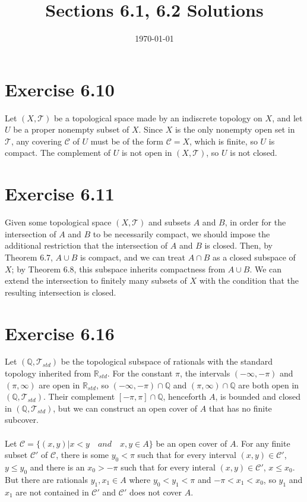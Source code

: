 \documentclass{article}
\title{\textbf{Sections 6.1, 6.2 Solutions}}
\date{}
\date\today
\begin{document}
\maketitle %

\thispagestyle{firstpage}
\section*{Exercise 6.10}

Let $(X, \mathcal{T})$ be a topological space made by an indiscrete topology on $X$, and let $U$ be a proper nonempty subset of $X$.  
Since $X$ is the only nonempty open set in $\mathcal{T}$, any covering $\mathcal{C}$ of $U$ must be of the form $\mathcal{C} = X$, which 
is finite, so $U$ is compact.  The complement of $U$ is not open in $(X, \mathcal{T})$, so $U$ is not closed. 


\section*{Exercise 6.11} 

Given some topological space $(X, \mathcal{T})$ and subsets $A$ and $B$, in order for the intersection of  
$A$ and $B$ to be necessarily compact, we should impose the additional restriction that 
the intersection of $A$ and $B$ is closed.  Then, by Theorem 6.7, $A \cup B$ is compact, and 
we can treat $A \cap B$ as a closed subspace of $X$; by Theorem 6.8, this subspace
inherits compactness from $A \cup B$.  We can extend the intersection to finitely many subsets of $X$ with the condition 
that the resulting intersection is closed.



\section*{Exercise 6.16}

Let $(\mathbb{Q}, \mathcal{T}_{std})$ be the topological subspace of rationals with the standard topology inherited from $\mathbb{R}_{std}$.  
For the constant $\pi$, the intervals $(-\infty, -\pi)$ and $(\pi, \infty)$ are open in $\mathbb{R}_{std}$, so $(-\infty, -\pi) \cap \mathbb{Q}$ 
and $(\pi, \infty) \cap \mathbb{Q}$ are both open in $(\mathbb{Q}, \mathcal{T}_{std})$.  Their complement $[-\pi, \pi] \cap \mathbb{Q}$, henceforth $A$,  
is bounded and closed in $(\mathbb{Q}, \mathcal{T}_{std})$, but we can construct an open cover of $A$ that has no finite subcover.\\ 
\\ 
Let $\mathcal{C} = \{ (x, y) | x < y \quad and \quad x, y \in A \}$ be an open cover of $A$.  For any finite subset $\mathcal{C}'$ of 
$\mathcal{C}$, there is some $y_0 < \pi$ such that for every interval $(x, y) \in \mathcal{C}'$, $y \leq y_0$ and there is an $x_0 > -\pi$ such that 
for every interal $(x, y) \in \mathcal{C}'$, $x \leq x_0$.  But there are rationals $y_1, x_1 \in A$ where $y_0 < y_1 < \pi$ and $-\pi < x_1 < x_0$, so 
$y_1$ and $x_1$ are not contained in $\mathcal{C}'$ and $\mathcal{C}'$ does not cover $A$.
\end{document}
